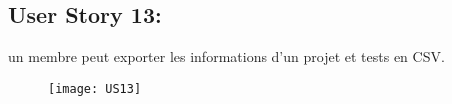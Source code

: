 \newpage
\subsection{User Story 13:}
un membre peut exporter les informations d'un projet et tests en CSV.

\begin{figure}[!h]
  \begin{center}
        \texttt{[image: US13]}
        \label{US13-dia}
  \end{center}
\end{figure}